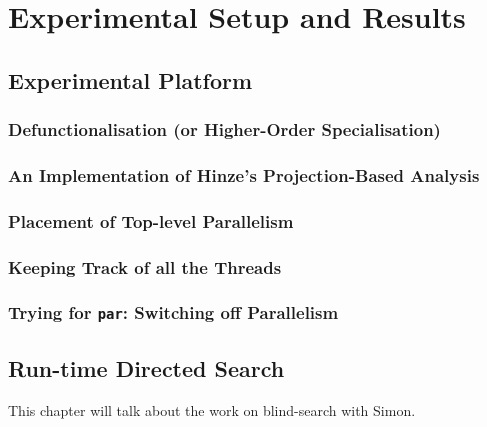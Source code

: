 \documentclass[dottedtoc, headinclude, footinclude=true, a4paper, numbers=noenddot]{scrreprt}
\begin{document}
\part{Experimental Setup and Results}
\label{part:implementation}

    \chapter{Experimental Platform} 
    \label{chap:platform}
    
    
        \section{Defunctionalisation (or Higher-Order Specialisation)}
        \label{sec:defunctionalisation}
        
    
        \section{An Implementation of Hinze's Projection-Based Analysis}
        \label{sec:hinzeImplementation}
        
        \section{Placement of Top-level Parallelism}
        \label{sec:parPlacement}
        
    
        \section{Keeping Track of all the Threads}
        \label{sec:logging}
        
    
        \section{Trying for \texttt{par}: Switching off Parallelism}
        \label{sec:parSwitching}
        
    
    \chapter{Run-time Directed Search}
    \label{chap:blind}
    
        This chapter will talk about the work on blind-search with Simon.
    
\end{document}
